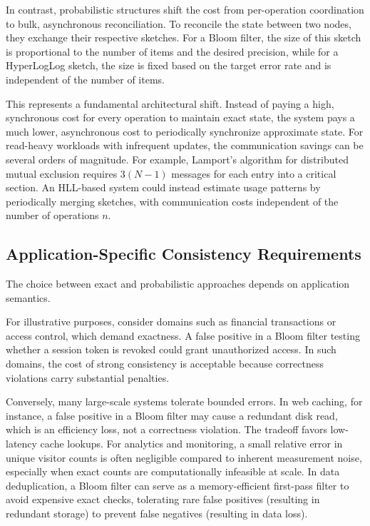 In contrast, probabilistic structures shift the cost from per-operation coordination to bulk, asynchronous reconciliation. To reconcile the state between two nodes, they exchange their respective sketches. For a Bloom filter, the size of this sketch is proportional to the number of items and the desired precision, while for a HyperLogLog sketch, the size is fixed based on the target error rate and is independent of the number of items.

This represents a fundamental architectural shift. Instead of paying a high, synchronous cost for every operation to maintain exact state, the system pays a much lower, asynchronous cost to periodically synchronize approximate state. For read-heavy workloads with infrequent updates, the communication savings can be several orders of magnitude. For example, Lamport's algorithm for distributed mutual exclusion requires $3(N-1)$ messages for each entry into a critical section. An HLL-based system could instead estimate usage patterns by periodically merging sketches, with communication costs independent of the number of operations $n$.

\subsection{Application-Specific Consistency Requirements}

The choice between exact and probabilistic approaches depends on application semantics.

For illustrative purposes, consider domains such as financial transactions or access control, which demand exactness. A false positive in a Bloom filter testing whether a session token is revoked could grant unauthorized access. In such domains, the cost of strong consistency is acceptable because correctness violations carry substantial penalties.

Conversely, many large-scale systems tolerate bounded errors. In web caching, for instance, a false positive in a Bloom filter may cause a redundant disk read, which is an efficiency loss, not a correctness violation. The tradeoff favors low-latency cache lookups. For analytics and monitoring, a small relative error in unique visitor counts is often negligible compared to inherent measurement noise, especially when exact counts are computationally infeasible at scale. In data deduplication, a Bloom filter can serve as a memory-efficient first-pass filter to avoid expensive exact checks, tolerating rare false positives (resulting in redundant storage) to prevent false negatives (resulting in data loss).

